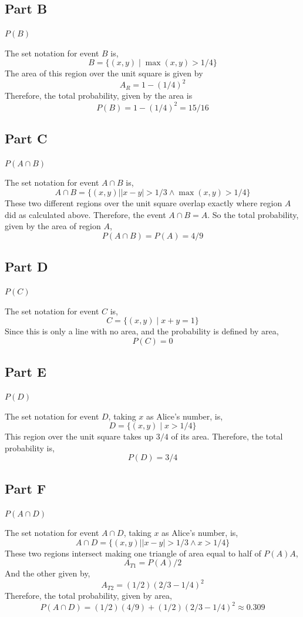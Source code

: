 \documentclass{article}
\begin{document}
\subsection*{Part B}

\textit{$ P(B) $}

\bigbreak

The set notation for event $ B $ is,
$$ B = \{ (x, y) \mid \max{(x, y)} > 1/4 \} $$
The area of this region over the unit square is given by
$$ A_R = 1 - (1/4)^2 $$
Therefore, the total probability, given by the area is
$$ P(B) = 1 - (1/4)^2 = 15/16 $$

\subsection*{Part C}

\textit{$ P(A \cap B) $}

\bigbreak

The set notation for event $ A \cap B $ is,
$$ A \cap B = \{ (x, y) \mid \vert x - y \vert > 1/3 \land \max{(x, y)} > 1/4 \}
$$
These two different regions over the unit square overlap exactly where region $
A $ did as calculated above. Therefore, the event $ A \cap B  = A $. So the
total probability, given by the area of region $ A $,
$$ P(A \cap B) = P(A) = 4/9 $$

\subsection*{Part D}

\textit{$ P(C) $}

\bigbreak

The set notation for event $ C $ is,
$$ C = \{ (x, y) \mid x + y = 1 \} $$
Since this is only a line with no area, and the probability is defined by area,
$$ P(C) = 0 $$

\subsection*{Part E}

\textit{$ P(D) $}

\bigbreak

The set notation for event $ D $, taking $ x $ as Alice's number, is,
$$ D = \{ (x, y) \mid x > 1/4 \} $$
This region over the unit square takes up $ 3/4 $ of its area. Therefore, the
total probability is,
$$ P(D) = 3/4 $$

\subsection*{Part F}

\textit{$ P(A \cap D) $}

\bigbreak

The set notation for event $ A \cap D $, taking $ x $ as Alice's number, is,
$$ A \cap D = \{ (x, y) \mid \vert x - y \vert > 1/3 \land x > 1/4 \} $$
These two regions intersect making one triangle of area equal to half of $ P(A)
A $,
$$ A_{T1} = P(A) / 2 $$
And the other given by,
$$ A_{T2} = (1/2)(2/3 - 1/4)^2 $$
Therefore, the total probability, given by area,
$$ P(A \cap D) = (1/2)(4/9) + (1/2)(2/3 - 1/4)^2 \approx 0.309 $$
\end{document}
